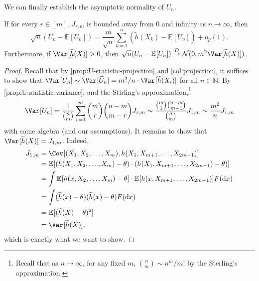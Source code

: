 We can finally establish the asymptotic normality of \(U_n\).

\begin{theorem}\label{thm:U-statistic}
	If for every \(r \in [m]\), \(J_{r, m}\) is bounded away from \(0\) and infinity as \(n \to \infty \), then
	\[
		\sqrt{n} (U_n - \mathbb{E}_{}[U_n] )
		= \frac{m}{\sqrt{n} } \sum_{k=1}^{n} (\widetilde{h} (X_k) - \mathbb{E}_{}[U_n] ) + o_p(1).
	\]
	Furthermore, if \(\Var_{}[\widetilde{h} (X)] > 0\), then \(\sqrt{n} (U_n - \mathbb{E}_{}[U_n] ) \overset{D}{\to} \mathcal{N} (0, m^2 \Var_{}[\widetilde{h} (X)] )\).
\end{theorem}
\begin{proof}
	Recall that by \autoref{prop:U-statistic-projection} and \autoref{col:projection}, it suffices to show that \(\Var_{}[U_n] \sim \Var_{}[\widetilde{U} _n] = m^2 / n \cdot \Var_{}[\widetilde{h} (X_i)]\) for all \(n \in \mathbb{N} \). By \autoref{prop:U-statistic-variance}, and the Stirling's approximation,\footnote{Recall that as \(n \to \infty \), for any fixed \(m\), \(\binom{n}{m} \sim n^m / m!\) by the Sterling's approximation.}
	\[
		\Var_{}[U_n]
		= \frac{1}{\binom{n}{m}} \sum_{r=1}^{m} \binom{m}{r} \binom{n-m}{m-r} J_{r, m}
		\sim \frac{\binom{m}{1} \binom{n-m}{m-1}}{\binom{n}{m}} J_{1, m}
		\sim \frac{m^2}{n} J_{1, m}
	\]
	with some algebra (and our assumptions). It remains to show that \(\Var_{}[\widetilde{h} (X)] = J_{1, m}\). Indeed,
	\[
		\begin{split}
			J_{1, m}
			 & = \Cov_{}[(X_1, X_2, \dots , X_m), h(X_1, X_{m+1}, \dots , X_{2m-1})]                                                       \\
			 & = \mathbb{E}_{}[(h(X_1, X_2, \dots , X_m) - \theta ) \cdot (h(X_1, X_{m+1}, \dots , X_{2m-1}) - \theta ) ]                  \\
			 & = \int \mathbb{E}_{}[h(x, X_2, \dots , X_m) - \theta ] \cdot \mathbb{E}_{}[h(x, X_{m+1}, \dots , X_{2m-1})] F(\mathrm{d} x) \\
			 & = \int (\widetilde{h} (x) - \theta ) (\widetilde{h} (x) - \theta ) F(\mathrm{d} x)                                          \\
			 & = \mathbb{E}_{}[(\widetilde{h} (X) - \theta )^2]                                                                            \\
			 & = \Var_{}[\widetilde{h} (X)] ,
		\end{split}
	\]
	which is exactly what we want to show.
\end{proof}

